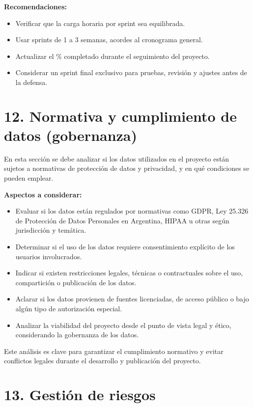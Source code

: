 \documentclass[
11pt, %
]{charter}
\begin{document}
\textbf{Recomendaciones:}
\begin{itemize}
  \item Verificar que la carga horaria por sprint sea equilibrada.
  \item Usar sprints de 1 a 3 semanas, acordes al cronograma general.
  \item Actualizar el \% completado durante el seguimiento del proyecto.
  \item Considerar un sprint final exclusivo para pruebas, revisión y ajustes antes de la defensa.
\end{itemize}


\section{12. Normativa y cumplimiento de datos (gobernanza)}

En esta sección se debe analizar si los datos utilizados en el proyecto están sujetos a normativas de protección de datos y privacidad, y en qué condiciones se pueden emplear.

\textbf{Aspectos a considerar:}
\begin{itemize}
  \item Evaluar si los datos están regulados por normativas como GDPR, Ley 25.326 de Protección de Datos Personales en Argentina, HIPAA u otras según jurisdicción y temática.
  \item Determinar si el uso de los datos requiere consentimiento explícito de los usuarios involucrados.
  \item Indicar si existen restricciones legales, técnicas o contractuales sobre el uso, compartición o publicación de los datos.
  \item Aclarar si los datos provienen de fuentes licenciadas, de acceso público o bajo algún tipo de autorización especial.
  \item Analizar la viabilidad del proyecto desde el punto de vista legal y ético, considerando la gobernanza de los datos.
\end{itemize}

Este análisis es clave para garantizar el cumplimiento normativo y evitar conflictos legales durante el desarrollo y publicación del proyecto.


\section{13. Gestión de riesgos}
\label{sec:riesgos}
\end{document}

